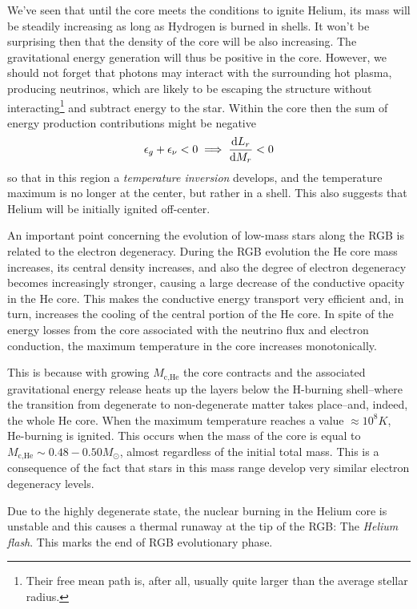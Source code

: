 We've seen that until the core meets the conditions to ignite Helium, its mass will be steadily increasing as long as Hydrogen is burned in shells. It won't be surprising then that the density of the core will be also increasing. The gravitational energy generation will thus be positive in the core. However, we should not forget that photons may interact with the surrounding hot plasma, producing neutrinos, which are likely to be escaping the structure without interacting\footnote{Their free mean path is, after all, usually quite larger than the average stellar radius.} and subtract energy to the star. Within the core then the sum of energy production contributions might be negative
\begin{equation*}
    \epsilon_{g}+\epsilon_{\nu} < 0 \implies \frac{\text{d}L_{r}}{\text{d}M_{r}} < 0
\end{equation*}
so that in this region a \emph{temperature inversion} develops, and the temperature maximum is no longer at the center, but rather in a shell. This also suggests that Helium will be initially ignited off-center.
\par An important point concerning the evolution of low-mass stars along the RGB is related to the electron degeneracy. During the RGB evolution the He core mass increases, its central density increases, and also the degree of electron degeneracy becomes increasingly stronger, causing a large decrease of the conductive opacity in the He core. This makes the conductive energy transport very efficient and, in turn, increases the cooling of the central portion of the He core. In spite of the energy losses from the core associated with the neutrino flux and electron conduction, the maximum temperature in the core increases monotonically.
\par This is because with growing $M_{\text{c,He}}$ the core contracts and the associated gravitational energy release heats up the layers below the H-burning shell--where the transition from degenerate to non-degenerate matter takes place--and, indeed, the whole He core. When the maximum temperature reaches a value $\approx 10^{8}\unit{K}$, He-burning is ignited. This occurs when the mass of the core is equal to $M_{\text{c,He}}\sim 0.48-0.50M_{\odot}$, almost regardless of the initial total mass. This is a consequence of the fact that stars in this mass range develop very similar electron degeneracy levels.
\par Due to the highly degenerate state, the nuclear burning in the Helium core is unstable and this causes a thermal runaway at the tip of the RGB: The \emph{Helium flash}. This marks the end of RGB evolutionary phase.
